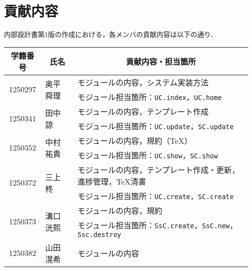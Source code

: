 \chapter{貢献内容}
内部設計書第1版の作成における，各メンバの貢献内容は以下の通り．
\begin{table}[h]
	\centering
	\begin{tabularx}{\textwidth}{cll}
		\multicolumn{1}{c}{学籍番号} & \multicolumn{1}{c}{氏名} & \multicolumn{1}{c}{貢献内容・担当箇所}                                                     \\
		\hline
		\multirow{2}{*}{1250297} & \multirow{2}{*}{奥平 舜理} & モジュールの内容，システム実装方法                                                                 \\
		                         &                        & モジュール担当箇所：\texttt{UC.index}，\texttt{UC.home}                                      \\
		\hline
		\multirow{2}{*}{1250341} & \multirow{2}{*}{田中 諒}  & モジュールの内容，テンプレート作成                                                                 \\
		                         &                        & モジュール担当箇所：\texttt{UC.update}，\texttt{SC.update}                                   \\
		\hline
		\multirow{2}{*}{1250352} & \multirow{2}{*}{中村 祐貴} & モジュールの内容，規約（\TeX ）                                                                \\
		                         &                        & モジュール担当箇所：\texttt{UC.show}，\texttt{SC.show}                                       \\
		\hline
		\multirow{2}{*}{1250372} & \multirow{2}{*}{三上 柊}  & モジュールの内容，テンプレート作成・更新，進捗管理，\TeX 清書                                                 \\
		                         &                        & モジュール担当箇所：\texttt{UC.create}，\texttt{SC.create}                                   \\
		\hline
		\multirow{2}{*}{1250373} & \multirow{2}{*}{溝口 洸熙} & モジュールの内容，規約                                                                       \\
		                         &                        & モジュール担当箇所：\texttt{SsC.create}，\texttt{SsC.new}，\texttt{Ssc.destroy}               \\
		\hline
		\multirow{2}{*}{1250382} & \multirow{2}{*}{山田 滉希} & モジュールの内容                                                                          \\

\end{tabularx}
\end{table}
